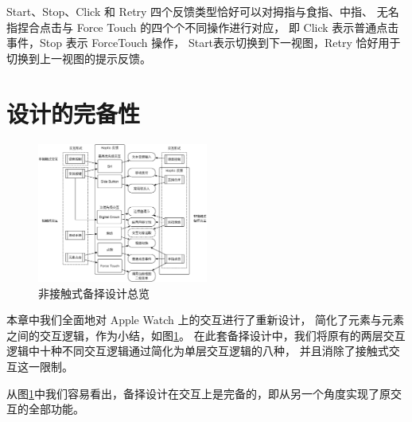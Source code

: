 Start、Stop、Click 和 Retry 四个反馈类型恰好可以对拇指与食指、中指、
无名指捏合点击与 Force Touch 的四个个不同操作进行对应，
即 Click 表示普通点击事件，Stop 表示 ForceTouch 操作，
Start表示切换到下一视图，Retry 恰好用于切换到上一视图的提示反馈。

\section{设计的完备性}
\label{sec:completeless}

\begin{figure}[H]
    \kaishu
    \centering
    \includegraphics[width=0.5\textwidth]{figures/interaction}
    \caption{\kaishu 非接触式备择设计总览}
    \label{fig:interaction}
\end{figure}

本章中我们全面地对 Apple Watch 上的交互进行了重新设计，
简化了元素与元素之间的交互逻辑，作为小结，如图\ref{fig:interaction}。
在此套备择设计中，我们将原有的两层交互逻辑中十种不同交互逻辑通过简化为单层交互逻辑的八种，
并且消除了接触式交互这一限制。

从图\ref{fig:interaction}中我们容易看出，备择设计在交互上是完备的，即从另一个角度实现了原交互的全部功能。

\cleardoublepage
